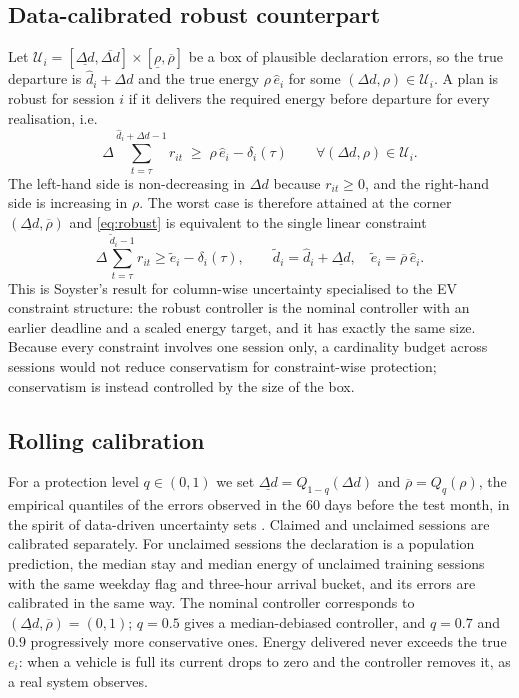 \subsection{Data-calibrated robust counterpart}\label{sec:robust}
Let $\mathcal U_i=[\underline{\Delta d},\overline{\Delta d}]\times[\underline\rho,\overline\rho]$ be a box of plausible declaration errors, so the true departure is $\hat d_i+\Delta d$ and the true energy $\rho\,\hat e_i$ for some $(\Delta d,\rho)\in\mathcal U_i$. A plan is robust for session $i$ if it delivers the required energy before departure for every realisation, i.e.
\begin{equation}
\Delta\!\!\sum_{t=\tau}^{\hat d_i+\Delta d-1}\! r_{it} \;\ge\; \rho\,\hat e_i-\delta_i(\tau)\qquad \forall(\Delta d,\rho)\in\mathcal U_i . \label{eq:robust}
\end{equation}
The left-hand side is non-decreasing in $\Delta d$ because $r_{it}\ge0$, and the right-hand side is increasing in $\rho$. The worst case is therefore attained at the corner $(\underline{\Delta d},\overline\rho)$ and \eqref{eq:robust} is equivalent to the single linear constraint
\begin{equation}
\Delta\!\!\sum_{t=\tau}^{\tilde d_i-1}\! r_{it} \ge \tilde e_i-\delta_i(\tau),\qquad \tilde d_i=\hat d_i+\underline{\Delta d},\quad \tilde e_i=\overline\rho\,\hat e_i . \label{eq:rc}
\end{equation}
This is Soyster's result for column-wise uncertainty \cite{Soyster1973} specialised to the EV constraint structure: the robust controller is the nominal controller with an earlier deadline and a scaled energy target, and it has exactly the same size. Because every constraint involves one session only, a cardinality budget across sessions \cite{Bertsimas2004Price} would not reduce conservatism for constraint-wise protection; conservatism is instead controlled by the size of the box.

\subsection{Rolling calibration}\label{sec:calib}
For a protection level $q\in(0,1)$ we set $\underline{\Delta d}=Q_{1-q}(\Delta d)$ and $\overline\rho=Q_q(\rho)$, the empirical quantiles of the errors observed in the 60 days before the test month, in the spirit of data-driven uncertainty sets \cite{Bertsimas2018DataDriven}. Claimed and unclaimed sessions are calibrated separately. For unclaimed sessions the declaration is a population prediction, the median stay and median energy of unclaimed training sessions with the same weekday flag and three-hour arrival bucket, and its errors are calibrated in the same way. The nominal controller corresponds to $(\underline{\Delta d},\overline\rho)=(0,1)$; $q=0.5$ gives a median-debiased controller, and $q=0.7$ and $0.9$ progressively more conservative ones. Energy delivered never exceeds the true $e_i$: when a vehicle is full its current drops to zero and the controller removes it, as a real system observes.

